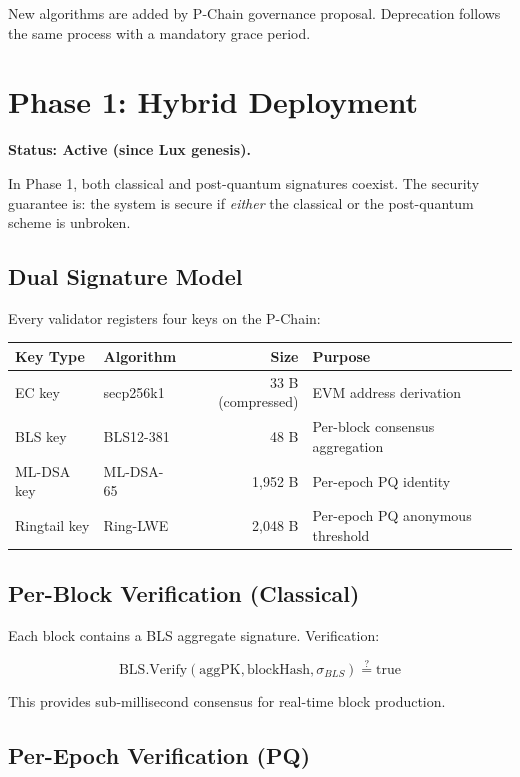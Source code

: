 \documentclass[11pt,a4paper]{article}
\begin{document}
New algorithms are added by P-Chain governance proposal. Deprecation follows the same process with a mandatory grace period.

\section{Phase 1: Hybrid Deployment}

\textbf{Status: Active (since Lux genesis).}

In Phase 1, both classical and post-quantum signatures coexist. The security guarantee is: the system is secure if \emph{either} the classical or the post-quantum scheme is unbroken.

\subsection{Dual Signature Model}

Every validator registers four keys on the P-Chain:

\begin{center}
\begin{tabular}{llrl}
\toprule
\textbf{Key Type} & \textbf{Algorithm} & \textbf{Size} & \textbf{Purpose} \\
\midrule
EC key & secp256k1 & 33 B (compressed) & EVM address derivation \\
BLS key & BLS12-381 & 48 B & Per-block consensus aggregation \\
ML-DSA key & ML-DSA-65 & 1,952 B & Per-epoch PQ identity \\
Ringtail key & Ring-LWE & 2,048 B & Per-epoch PQ anonymous threshold \\
\bottomrule
\end{tabular}
\end{center}

\subsection{Per-Block Verification (Classical)}

Each block contains a BLS aggregate signature. Verification:

$$\text{BLS.Verify}(\text{aggPK}, \text{blockHash}, \sigma_{BLS}) \stackrel{?}{=} \text{true}$$

This provides sub-millisecond consensus for real-time block production.

\subsection{Per-Epoch Verification (PQ)}
\end{document}
